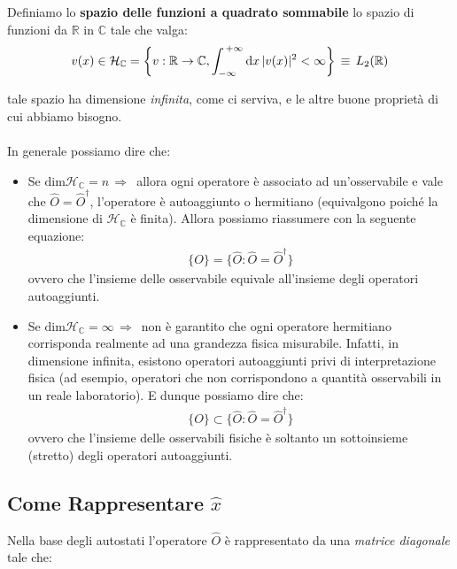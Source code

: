 \begin{mydef}
	Definiamo lo \textbf{spazio delle funzioni a quadrato sommabile} lo spazio di funzioni da $\mathbb{R}$ in $\mathbb{C}$ tale che valga:
\begin{align*}
	v(x) \in \mathcal{H}_{\mathbb{C}} = \qty{v : \mathbb{R} \to \mathbb{C}, \int_{-\infty}^{\, +\infty} \dd x \, |v(x)|^2 < \infty } \, \equiv \, L_2(\mathbb{R})
\end{align*}
\end{mydef}

	tale spazio ha dimensione \textit{infinita}, come ci serviva, e le altre buone proprietà di cui abbiamo bisogno.
	\\
	\\
	In generale possiamo dire che:
	
\begin{itemize}
	\item Se $\text{dim}\mathcal{H}_{\mathbb{C}} = n \, \Rightarrow \, $ allora ogni operatore è associato ad un'osservabile e vale che $\hat{O} = \hat{O}^{\dagger}$, l'operatore è autoaggiunto o hermitiano (equivalgono poiché la dimensione di $\mathcal{H}_{\mathbb{C}}$ è finita). Allora possiamo riassumere con la seguente equazione:
	\begin{align*}
		\{ O \} = \{ \hat{O} : \hat{O} = \hat{O}^{\dagger} \}
	\end{align*}
		ovvero che l'insieme delle osservabile equivale all'insieme degli operatori autoaggiunti.
	\item Se $\text{dim}\mathcal{H}_{\mathbb{C}} = \infty \, \Rightarrow \, $ non è garantito che ogni operatore hermitiano corrisponda realmente ad una grandezza fisica misurabile. Infatti, in dimensione infinita, esistono operatori autoaggiunti privi di interpretazione fisica (ad esempio, operatori che non corrispondono a quantità osservabili in un reale laboratorio). E dunque possiamo dire che:
	\begin{align*}
		\{ O \} \subset \{ \hat{O} : \hat{O} = \hat{O}^{\dagger} \}
	\end{align*}
		ovvero che l'insieme delle osservabili fisiche è soltanto un sottoinsieme (stretto) degli operatori autoaggiunti.
\end{itemize}

\subsection{Come Rappresentare $\hat{x}$}

	Nella base degli autostati l'operatore $\hat{O}$ è rappresentato da una \textit{matrice diagonale} tale che:
	
